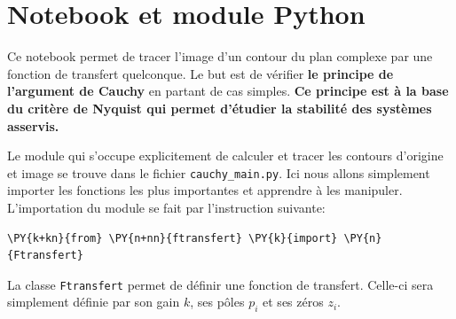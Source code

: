 \section{Notebook et module Python\label{principe-de-largument-de-cauchy}}
Ce notebook permet de tracer l'image d'un contour du plan complexe par
une fonction de transfert quelconque. Le but est de vérifier \textbf{le
principe de l'argument de Cauchy} en partant de cas simples. \textbf{Ce
principe est à la base du critère de Nyquist qui permet d'étudier la
stabilité des systèmes asservis.}
\begin{center}

\end{center}
Le module qui s'occupe explicitement de calculer et tracer les contours
d'origine et image se trouve dans le fichier \texttt{cauchy\_main.py}.
Ici nous allons simplement importer les fonctions les plus importantes
et apprendre à les manipuler.
L'importation du module se fait par l'instruction suivante:
\begin{tcolorbox}[breakable, size=fbox, boxrule=1pt, pad at break*=1mm,colback=cellbackground, colframe=cellborder]
\begin{Verbatim}[commandchars=\\\{\}]
\PY{k+kn}{from} \PY{n+nn}{ftransfert} \PY{k}{import} \PY{n}{Ftransfert}
\end{Verbatim}
\end{tcolorbox}

    La classe \texttt{Ftransfert} permet de définir une fonction de
transfert. Celle-ci sera simplement définie par son gain \(k\), ses
pôles \(p_i\) et ses zéros \(z_i\).

